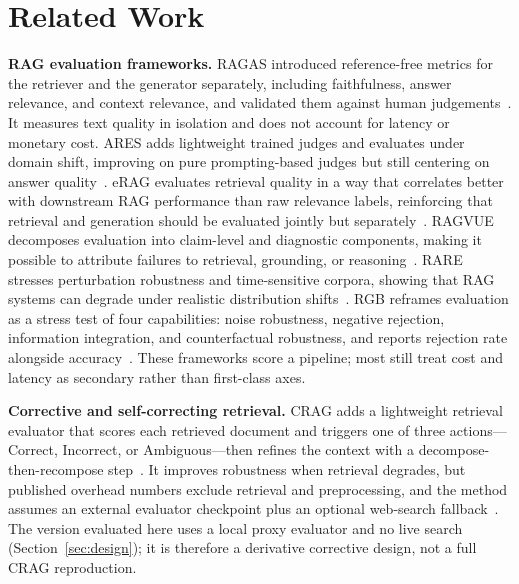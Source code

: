 
\section{Related Work}
\label{sec:related}

\textbf{RAG evaluation frameworks.}
RAGAS introduced reference-free metrics for the retriever and the
generator separately, including faithfulness, answer relevance, and
context relevance, and validated them against human
judgements~\cite{es2023ragas}. It measures text quality in isolation and
does not account for latency or monetary cost. ARES adds lightweight
trained judges and evaluates under domain shift, improving on pure
prompting-based judges but still centering on answer quality~\cite{saadfalcon2023ares}.
eRAG evaluates retrieval quality in a way that correlates better with
downstream RAG performance than raw relevance labels, reinforcing that
retrieval and generation should be evaluated jointly but
separately~\cite{salemi2024erag}. RAGVUE decomposes evaluation into
claim-level and diagnostic components, making it possible to attribute
failures to retrieval, grounding, or reasoning~\cite{murugaraj2025ragvue}.
RARE stresses perturbation robustness and time-sensitive corpora,
showing that RAG systems can degrade under realistic distribution
shifts~\cite{zeng2025rare}. RGB reframes evaluation as a stress test of
four capabilities: noise robustness, negative rejection, information
integration, and counterfactual robustness, and reports rejection rate
alongside accuracy~\cite{chen2023rgb}. These frameworks score a
pipeline; most still treat cost and latency as secondary rather than
first-class axes.

\textbf{Corrective and self-correcting retrieval.}
CRAG adds a lightweight retrieval evaluator that scores each retrieved
document and triggers one of three actions---Correct, Incorrect, or
Ambiguous---then refines the context with a decompose-then-recompose step~\cite{yan2024crag}.
It improves robustness when retrieval degrades, but published overhead
numbers exclude retrieval and preprocessing, and the method assumes an
external evaluator checkpoint plus an optional web-search
fallback~\cite{yan2024crag}. The version evaluated here uses a local
proxy evaluator and no live search (Section~\ref{sec:design}); it is
therefore a derivative corrective design, not a full CRAG reproduction.


